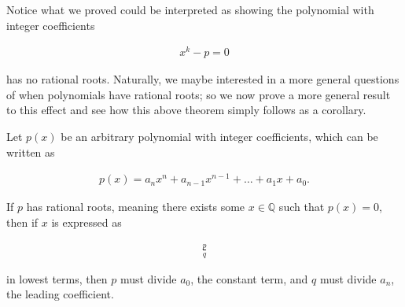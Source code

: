 \vspace{\baselineskip}

Notice what we proved could be interpreted as showing the polynomial with integer coefficients
	
	\begin{align*}
		x^k - p = 0
	\end{align*}
	
has no rational roots. Naturally, we maybe interested in a more general questions of when polynomials have rational roots; so we now prove a more general result to this effect and see how this above theorem simply follows as a corollary.

\vspace{\baselineskip}
\begin{theorem}
	Let $p(x)$ be an arbitrary polynomial with integer coefficients, which can be written as
	
	\begin{align*}
		p(x) = a_n x^n + a_{n - 1} x^{n - 1} + \dots + a_1 x + a_0.
	\end{align*}
	
	If $p$ has rational roots, meaning there exists some $x \in \mathbb{Q}$ such that $p(x) = 0$, then if $x$ is expressed as
	
	\begin{align*}
		\frac{p}{q}
	\end{align*}
	
	in lowest terms, then $p$ must divide $a_0$, the constant term, and $q$ must divide $a_n$, the leading coefficient.
\end{theorem}
